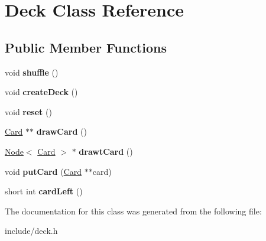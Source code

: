 \hypertarget{class_deck}{}\section{Deck Class Reference}
\label{class_deck}
\subsection*{Public Member Functions}
\begin{DoxyCompactItemize}
\item 
\mbox{\label{class_deck_ae5a1e52ab00ae5924f2bc6b730dba3eb}} 
void {\bfseries shuffle} ()
\item 
\mbox{\label{class_deck_a4cc7e93076105621411a7885db6c5347}} 
void {\bfseries create\+Deck} ()
\item 
\mbox{\label{class_deck_a14aa4f2f94b6b880cd575cf17af26762}} 
void {\bfseries reset} ()
\item 
\mbox{\label{class_deck_a20bd12c481b5e8620ab54e96ab256ec7}} 
\hyperlink{class_card}{Card} $\ast$$\ast$ {\bfseries draw\+Card} ()
\item 
\mbox{\label{class_deck_a4e7774435643a3a8d32411ddb10a71b4}} 
\hyperlink{struct_node}{Node}$<$ \hyperlink{class_card}{Card} $>$ $\ast$ {\bfseries drawt\+Card} ()
\item 
\mbox{\label{class_deck_a91a42ff92ad997778fa3dfdf57799047}} 
void {\bfseries put\+Card} (\hyperlink{class_card}{Card} $\ast$$\ast$card)
\item 
\mbox{\label{class_deck_a7fab334c55bb624258a443742b3d97c2}} 
short int {\bfseries card\+Left} ()
\end{DoxyCompactItemize}


The documentation for this class was generated from the following file\+:\begin{DoxyCompactItemize}
\item 
include/deck.\+h\end{DoxyCompactItemize}
